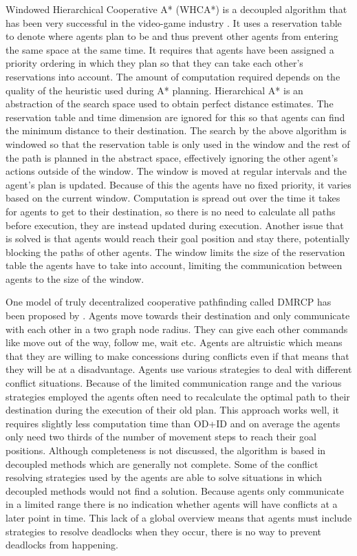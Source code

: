 Windowed Hierarchical Cooperative A* (WHCA*) is a decoupled algorithm that has
been very successful in the video-game industry \cite{silver2005}. It uses a
reservation table to denote where agents plan to be and thus prevent other
agents from entering the same space at the same time. It requires that agents
have been assigned a priority ordering in which they plan so that they can take
each other's reservations into account. The amount of computation required
depends on the quality of the heuristic used during A* planning. Hierarchical
A* is an abstraction of the search space used to obtain perfect distance
estimates. The reservation table and time dimension are ignored for this so
that agents can find the minimum distance to their destination. The search by
the above algorithm is windowed so that the reservation table is only used in
the window and the rest of the path is planned in the abstract space,
effectively ignoring the other agent's actions outside of the window. The
window is moved at regular intervals and the agent's plan is updated. Because
of this the agents have no fixed priority, it varies based on the current
window. Computation is spread out over the time it takes for agents to get to
their destination, so there is no need to calculate all paths before execution,
they are instead updated during execution. Another issue that is solved is that
agents would reach their goal position and stay there, potentially blocking the
paths of other agents. The window limits the size of the reservation table the
agents have to take into account, limiting the
communication between agents to the size of the window.

One model of truly decentralized cooperative pathfinding called DMRCP has been
proposed by
\cite{wei2016}. Agents move towards their destination and only communicate with
each other in a two graph node radius. They can give each other commands like
move out of the way, follow me, wait etc. Agents are altruistic which means
that they are willing to make concessions during conflicts even if that means
that they will be at a disadvantage. Agents use various strategies to deal with
different conflict situations. Because of the limited communication range and
the various strategies employed the agents often need to recalculate the
optimal path to their destination during the execution of their old plan. This
approach works well, it requires slightly less computation time than OD+ID and
on average the agents only need two thirds of the number of movement steps to
reach their goal positions. Although completeness is not discussed, the
algorithm is based in decoupled methods which are generally not complete. Some
of the conflict resolving strategies used by the agents are able to solve
situations in which decoupled methods would not find a solution.
Because agents only communicate in a limited range there is no indication
whether agents will have conflicts at a later point in time. This lack of a
global overview means that agents must include strategies to resolve deadlocks
when they occur, there is no way to prevent deadlocks from happening.

